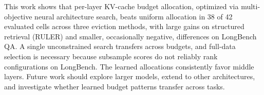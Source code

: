\documentclass[11pt]{article}
\begin{document}
This work shows that per-layer KV-cache budget allocation, optimized via multi-objective neural architecture search, beats uniform allocation in 38 of 42 evaluated cells across three eviction methods, with large gains on structured retrieval (RULER) and smaller, occasionally negative, differences on LongBench QA. A single unconstrained search transfers across budgets, and full-data selection is necessary because subsample scores do not reliably rank configurations on LongBench. The learned allocations consistently favor middle layers. Future work should explore larger models, extend to other architectures, and investigate whether learned budget patterns transfer across tasks.

\FloatBarrier




\end{document}
